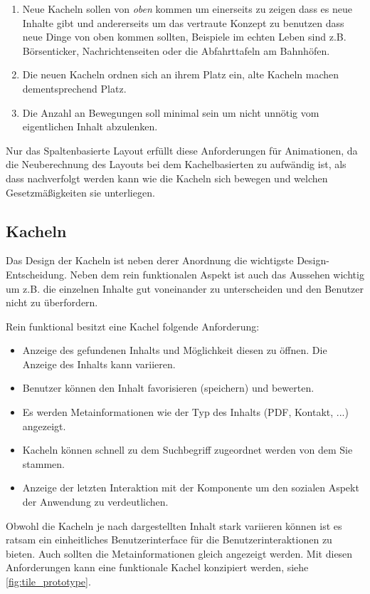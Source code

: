 \documentclass[12pt,twoside]{book}
\begin{document}
\begin{enumerate}
  \item Neue Kacheln sollen von \textit{oben} kommen um einerseits zu zeigen dass es neue Inhalte gibt und andererseits um das vertraute Konzept zu benutzen dass neue Dinge von oben kommen sollten, Beispiele im echten Leben sind z.B. Börsenticker, Nachrichtenseiten oder die Abfahrttafeln am Bahnhöfen.
  
  \item Die neuen Kacheln ordnen sich an ihrem Platz ein, alte Kacheln machen dementsprechend Platz.
  \item Die Anzahl an Bewegungen soll minimal sein um nicht unnötig vom eigentlichen Inhalt abzulenken.
\end{enumerate}

Nur das Spaltenbasierte Layout erfüllt diese Anforderungen für Animationen, da die Neuberechnung des Layouts bei dem Kachelbasierten zu aufwändig ist, als dass nachverfolgt werden kann wie die Kacheln sich bewegen und welchen Gesetzmäßigkeiten sie unterliegen.

\subsection{Kacheln}\label{sec:tiles}

Das Design der Kacheln ist neben derer Anordnung die wichtigste Design-Entscheidung. Neben dem rein funktionalen Aspekt ist auch das Aussehen wichtig um z.B. die einzelnen Inhalte gut voneinander zu unterscheiden und den Benutzer nicht zu überfordern.

Rein funktional besitzt eine Kachel folgende Anforderung:

\begin{itemize}
  \item Anzeige des gefundenen Inhalts und Möglichkeit diesen zu öffnen. Die Anzeige des Inhalts kann variieren.
  \item Benutzer können den Inhalt favorisieren (speichern) und bewerten.
  \item Es werden Metainformationen wie der Typ des Inhalts (PDF, Kontakt, ...) angezeigt.
  \item Kacheln können schnell zu dem Suchbegriff zugeordnet werden von dem Sie stammen.
  \item Anzeige der letzten Interaktion mit der Komponente um den sozialen Aspekt der Anwendung zu verdeutlichen.
\end{itemize}

Obwohl die Kacheln je nach dargestellten Inhalt stark variieren können ist es ratsam ein einheitliches Benutzerinterface für die Benutzerinteraktionen zu bieten. Auch sollten die Metainformationen gleich angezeigt werden.
Mit diesen Anforderungen kann eine funktionale Kachel konzipiert werden, siehe \ref{fig:tile_prototype}.
\end{document}
